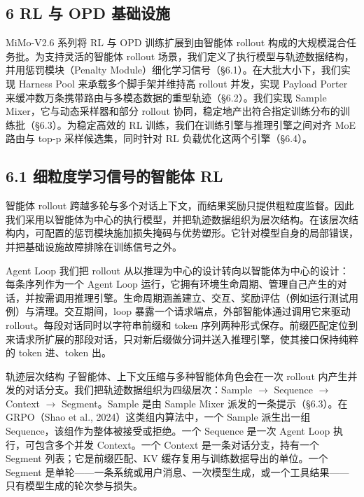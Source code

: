 \subsection{6 RL 与 OPD 基础设施}\label{rl-and-opd-infrastructure}

MiMo-V2.6 系列将 RL 与 OPD 训练扩展到由智能体 rollout 构成的大规模混合任务批。为支持灵活的智能体 rollout 场景，我们定义了执行模型与轨迹数据结构，并用惩罚模块（Penalty Module）细化学习信号（§6.1）。在大批大小下，我们实现 Harness Pool 来承载多个脚手架并维持高 rollout 并发，实现 Payload Porter 来缓冲数万条携带路由与多模态数据的重型轨迹（§6.2）。我们实现 Sample Mixer，它与动态采样器和部分 rollout 协同，稳定地产出符合指定训练分布的训练批（§6.3）。为稳定高效的 RL 训练，我们在训练引擎与推理引擎之间对齐 MoE 路由与 top-p 采样候选集，同时针对 RL 负载优化这两个引擎（§6.4）。

\subsection{6.1 细粒度学习信号的智能体 RL}\label{agentic-rl-with-fine-grained-learning-signals}

智能体 rollout 跨越多轮与多个对话上下文，而结果奖励只提供粗粒度监督。因此我们采用以智能体为中心的执行模型，并把轨迹数据组织为层次结构。在该层次结构内，可配置的惩罚模块施加损失掩码与优势塑形。它针对模型自身的局部错误，并把基础设施故障排除在训练信号之外。



Agent Loop 我们把 rollout 从以推理为中心的设计转向以智能体为中心的设计：每条序列作为一个 Agent Loop 运行，它拥有环境生命周期、管理自己产生的对话，并按需调用推理引擎。生命周期涵盖建立、交互、奖励评估（例如运行测试用例）与清理。交互期间，loop 暴露一个请求端点，外部智能体通过调用它来驱动 rollout。每段对话同时以字符串前缀和 token 序列两种形式保存。前缀匹配定位到来请求所扩展的那段对话，只对新后缀做分词并送入推理引擎，使其接口保持纯粹的 token 进、token 出。

轨迹层次结构 子智能体、上下文压缩与多种智能体角色会在一次 rollout 内产生并发的对话分支。我们把轨迹数据组织为四级层次：Sample $\to$ Sequence $\to$ Context $\to$ Segment。Sample 是由 Sample Mixer 派发的一条提示（§6.3）。在 GRPO（Shao et al., 2024）这类组内算法中，一个 Sample 派生出一组 Sequence，该组作为整体被接受或拒绝。一个 Sequence 是一次 Agent Loop 执行，可包含多个并发 Context。一个 Context 是一条对话分支，持有一个 Segment 列表；它是前缀匹配、KV 缓存复用与训练数据导出的单位。一个 Segment 是单轮——一条系统或用户消息、一次模型生成，或一个工具结果——只有模型生成的轮次参与损失。


